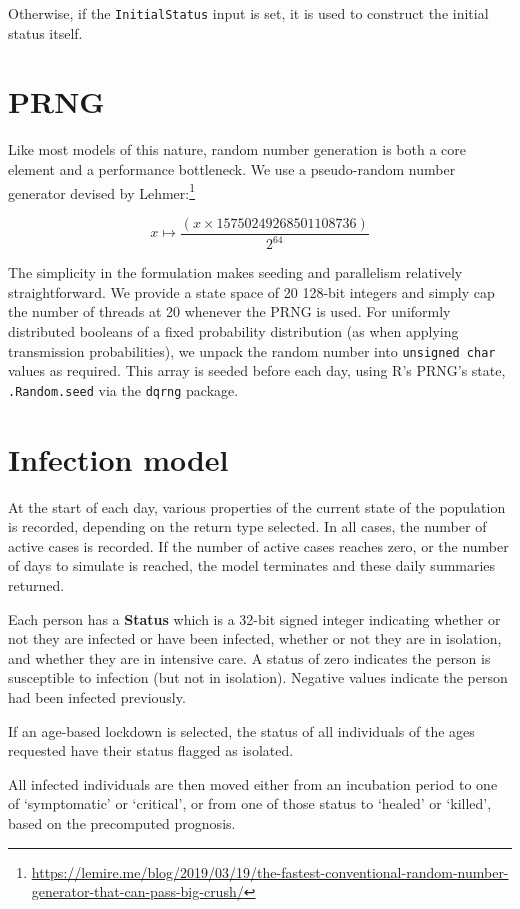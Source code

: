\documentclass[a4paper,11pt]{scrreprt}
\newcommand*{\code}[1]{\texttt{#1}}
\begin{document}
Otherwise, if the \code{InitialStatus} input is set, it is used to construct the initial status itself.

\section{PRNG}

Like most models of this nature, random number generation is both a core element and
a performance bottleneck.  We use a pseudo-random
number generator devised by Lehmer:\footnote{\url{https://lemire.me/blog/2019/03/19/the-fastest-conventional-random-number-generator-that-can-pass-big-crush/}}

\[x \mapsto \frac{(x \times 15750249268501108736)}{2^{64}}\]

The simplicity in the formulation makes seeding and parallelism relatively straightforward. We
provide a state space of 20 128-bit integers and simply cap the number of threads at 20 whenever
the PRNG is used. For uniformly distributed booleans of a fixed probability distribution
(as when applying transmission 
probabilities), we unpack the random number into \code{unsigned char} values as required. 
This array is seeded before each day, using R's PRNG's state, \code{.Random.seed} via 
the \code{dqrng} package.

\section{Infection model}

At the start of each day, various properties of the current state of the population is recorded, 
depending on the return type selected. In all cases, the number of active cases is recorded. 
If the number of active cases reaches zero, or the number of days to simulate is reached, the model
 terminates and these daily summaries returned.

Each person has a \textbf{Status} which is a 32-bit signed integer indicating whether or not
they are infected or have been infected, whether or not they are in isolation, and whether they are 
in intensive care. A status of zero indicates the person is susceptible to infection (but not
in isolation). Negative values indicate the person had been infected previously.


If an age-based lockdown is selected, the status of  all individuals of the ages requested have their
status flagged as isolated.

All infected individuals are then moved either from an incubation period to one of 
`symptomatic' or `critical', or from one of those status to `healed' or `killed', based
on the precomputed prognosis. 
\end{document}
